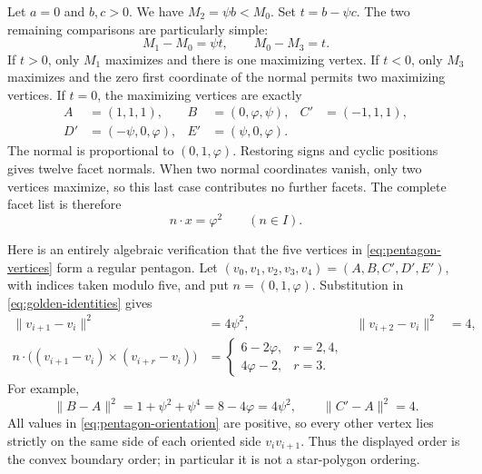 Let $a=0$ and $b,c>0$.  We have $M_2=\psi b<M_0$.
Set $t=b-\psi c$.  The two remaining comparisons are particularly
simple:
\[
 M_1-M_0=\psi t,\qquad M_0-M_3=t.
\]
If $t>0$, only $M_1$ maximizes and there is one maximizing vertex.
If $t<0$, only $M_3$ maximizes and the zero first coordinate of the
normal permits two maximizing vertices.
If $t=0$, the maximizing vertices are exactly
\begin{equation}\label{eq:pentagon-vertices}
 \begin{aligned}
 A&=(1,1,1), & B&=(0,\varphi,\psi), & C'&=(-1,1,1),\\
 D'&=(-\psi,0,\varphi), & E'&=(\psi,0,\varphi).
 \end{aligned}
\end{equation}
The normal is proportional to $(0,1,\varphi)$.
Restoring signs and cyclic positions gives twelve facet normals.
When two normal coordinates vanish, only two vertices maximize,
so this last case contributes no further facets.
The complete facet list is therefore
\begin{equation}\label{eq:dodeca-facets}
 n\cdot x=\varphi^2\qquad(n\in I).
\end{equation}

Here is an entirely algebraic verification that the five vertices in
\eqref{eq:pentagon-vertices} form a regular pentagon.
Let $(v_0,v_1,v_2,v_3,v_4)=(A,B,C',D',E')$, with indices taken modulo
five, and put $n=(0,1,\varphi)$.
Substitution in \eqref{eq:golden-identities} gives
\begin{align}
 \lVert v_{i+1}-v_i\rVert^2&=4\psi^2,
 &\lVert v_{i+2}-v_i\rVert^2&=4,
 \label{eq:pentagon-distances}\\
 n\cdot\bigl((v_{i+1}-v_i)\mathbin{\times}(v_{i+r}-v_i)\bigr)
 &=
 \begin{cases}
  6-2\varphi,&r=2,4,\\
  4\varphi-2,&r=3.
 \end{cases}
 \label{eq:pentagon-orientation}
\end{align}
For example,
\[
 \lVert B-A\rVert^2
 =1+\psi^2+\psi^4
 =8-4\varphi=4\psi^2,
 \qquad \lVert C'-A\rVert^2=4.
\]
All values in \eqref{eq:pentagon-orientation} are positive, so every
other vertex lies strictly on the same side of each oriented side
$v_iv_{i+1}$.  Thus the displayed order is the convex boundary order;
in particular it is not a star-polygon ordering.

